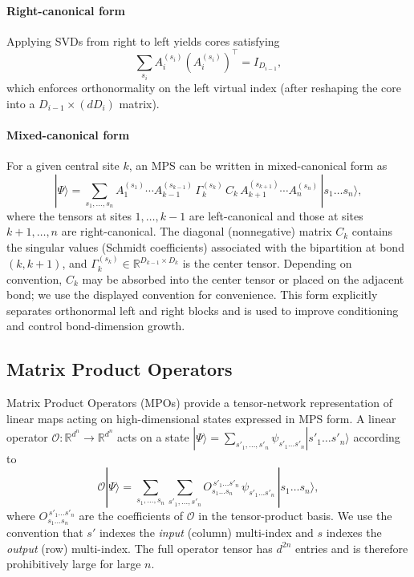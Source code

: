 \documentclass[letterpaper, 10 pt, conference]{ieeeconf}  %
\begin{document}
\paragraph{Right-canonical form}
Applying SVDs from right to left yields cores satisfying
\begin{equation}
\sum_{s_i}
A_i^{(s_i)} \left(A_i^{(s_i)}\right)^\top = I_{D_{i-1}},
\end{equation}
which enforces orthonormality on the left virtual index (after reshaping the
core into a $D_{i-1}\times(d D_i)$ matrix).

\paragraph{Mixed-canonical form}
For a given central site $k$, an MPS can be written in mixed-canonical form as
\begin{equation}
|\Psi\rangle
= \sum_{s_1,\dots,s_n}
A_1^{(s_1)} \cdots A_{k-1}^{(s_{k-1})}\,
\Gamma_k^{(s_k)} \, C_k \,
A_{k+1}^{(s_{k+1})} \cdots A_n^{(s_n)}
\, |s_1 \dots s_n\rangle,
\end{equation}
where the tensors at sites $1,\dots,k-1$ are left-canonical and those at
sites $k+1,\dots,n$ are right-canonical. The diagonal (nonnegative) matrix $C_k$ contains
the singular values (Schmidt coefficients) associated with the bipartition at
bond $(k,k+1)$, and $\Gamma_k^{(s_k)} \in \mathbb{R}^{D_{k-1} \times D_k}$ is
the center tensor. Depending on convention, $C_k$ may be absorbed into the
center tensor or placed on the adjacent bond; we use the displayed convention
for convenience. This form explicitly separates orthonormal left and right
blocks and is used to improve conditioning and control bond-dimension growth.

\subsection{Matrix Product Operators}

Matrix Product Operators (MPOs) \cite{Schollwock2011, Orus2014} provide a
tensor-network representation of linear maps acting on high-dimensional states
expressed in MPS form. A linear operator
$\mathcal{O} : \mathbb{R}^{d^n} \to \mathbb{R}^{d^n}$ acts on a state
$|\Psi\rangle = \sum_{s'_1,\dots,s'_n} \psi_{s'_1 \dots s'_n}
|s'_1 \dots s'_n\rangle$ according to
\begin{equation}
\mathcal{O} |\Psi\rangle
=
\sum_{s_1,\dots,s_n}
\sum_{s'_1,\dots,s'_n}
O_{s_1 \dots s_n}^{\, s'_1 \dots s'_n}\,
\psi_{s'_1 \dots s'_n}\,
|s_1 \dots s_n\rangle,
\end{equation}
where $O_{s_1 \dots s_n}^{\, s'_1 \dots s'_n}$ are the coefficients of
$\mathcal{O}$ in the tensor-product basis. We use the convention that $s'$
indexes the \emph{input} (column) multi-index and $s$ indexes the \emph{output}
(row) multi-index. The full operator tensor has $d^{2n}$ entries and is
therefore prohibitively large for large $n$.
\end{document}
